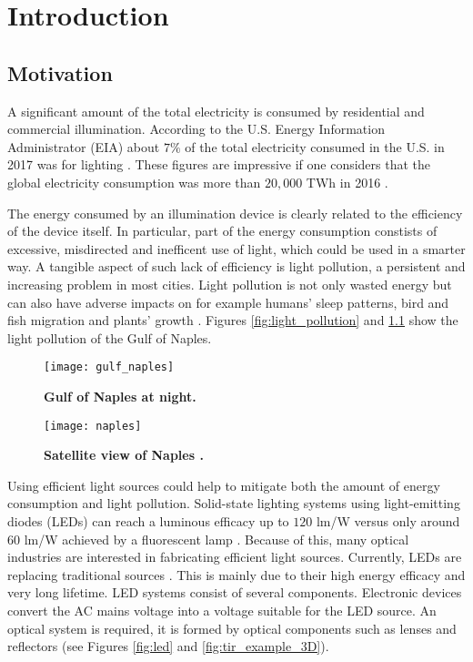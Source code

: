 \chapter{Introduction}
\section{Motivation}
A significant amount of the total electricity is consumed by residential and commercial illumination.
According to the U.S. Energy Information Administrator (EIA) about $7\%$ of the total electricity consumed in the U.S. in 2017 was for lighting \cite{electricity_light}. These figures are impressive if one considers that the global electricity consumption was more than $20,000$ TWh in 2016 \cite{statistic}. 

The energy consumed by an illumination device is clearly related to the efficiency of the device itself. 
In particular, part of the energy consumption constists of excessive, misdirected and inefficent use of light, which could be used in a smarter way. A tangible aspect of such lack of efficiency is light pollution, a persistent and increasing problem in most cities. Light pollution is not only wasted energy but can also have adverse impacts on for example humans’ sleep patterns, bird and fish migration and plants’ growth \cite{bergesen2016potential}. Figures \ref{fig:light_pollution} and \ref{fig:light_pollution2} show the light pollution of the Gulf of Naples.
\begin{figure}[t]
  \begin{minipage}[t]{0.49\textwidth}
    \texttt{[image: gulf\_naples]}
    \caption{\textbf{Gulf of Naples at night.}}
    \label{fig:light_pollution}
\end{minipage}
\hfill
 \begin{minipage}[t]{ 0.49\textwidth}
    \texttt{[image: naples]}
    \caption{\textbf{Satellite view of Naples \cite{nasa_image}.}}
    \label{fig:light_pollution2}
\end{minipage}
  \end{figure}

Using efficient light sources could help to mitigate both the amount of energy consumption and light pollution. %
Solid-state lighting systems using light-emitting diodes (LEDs) can reach a luminous efficacy up to $120$ \textrm{lm}/\textrm{W} versus only around $60$ \textrm{lm}/\textrm{W} achieved by a fluorescent lamp \cite{bergesen2016potential, humphreys2008solid}.
Because of this, many optical industries are interested in fabricating efficient light sources.
Currently, LEDs are replacing traditional sources \cite{koshel2012illumination}. 
This is mainly due to their high energy efficacy and very long lifetime. 
LED systems consist of several components. 
Electronic devices convert the AC mains voltage into a voltage suitable for the LED source.
An optical system is required, it is formed by optical components such as lenses and reflectors \cite{moreno2008modeling} (see Figures \ref{fig:led} and \ref{fig:tir_example_3D}).

